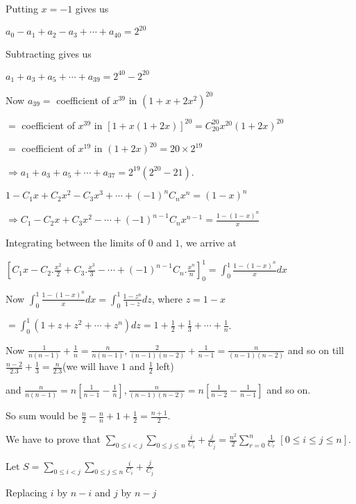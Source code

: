   Putting $x = -1$ gives us

  $a_0 - a_1 + a_2 - a_3 + \cdots + a_{40} = 2^{20}$

  Subtracting gives us

  $a_1 + a_3 + a_5 + \cdots + a_{39} = 2^{40} - 2^{20}$

  Now $a_{39} =$ coefficient of $x^{39}$ in $(1 + x + 2x^2)^{20}$

  $=$ coefficient of $x^{39}$ in $[1 + x(1 + 2x)]^{20} = C_{20}^{20}x^{20}(1 + 2x)^{20}$

  $=$ coefficient of $x^{19}$ in $(1 + 2x)^{20} = 20\times2^{19}$

  $\Rightarrow a_1 + a_3 + a_5 + \cdots + a_{37} = 2^{19}(2^{20} - 21)$.
\item $1 - C_1x + C_2x^2 - C_3x^3 + \cdots + (-1)^nC_nx^n = (1 - x)^n$

  $\Rightarrow C_1 - C_2x + C_3x^2 - \cdots + (-1)^{n - 1}C_nx^{n - 1} = \frac{1 - (1 - x)^n}{x}$

  Integrating between the limits of $0$ and $1$, we arrive at

  $\left[C_1x - C_2.\frac{x^2}{2} + C_3.\frac{x^3}{3} - \cdots + (-1)^{n - 1}C_n.\frac{x^n}{n}\right]_0^1 =
  \displaystyle\int_0^1\frac{1 - (1 - x)^n}{x}dx$

  Now $\displaystyle\int_0^1\frac{1 - (1 - x)^n}{x}dx = \int_0^1\frac{1 - z^n}{1 - z}dz$, where $z = 1 - x$

  $= \displaystyle\int_0^1(1 + z + z^2 + \cdots + z^n)dz = 1 + \frac{1}{2} + \frac{1}{3} + \cdots +
  \frac{1}{n}$.

  Now $\frac{1}{n(n - 1)} + \frac{1}{n} = \frac{n}{n(n - 1)}, \frac{2}{(n - 1)(n - 2)}+ \frac{1}{n - 1} =
  \frac{n}{(n - 1)(n - 2)}$ and so on till $\frac{n - 2}{2.3} + \frac{1}{3} = \frac{n}{2.3}$(we will have
  $1$ and $\frac{1}{2}$ left)

  and $\frac{n}{n(n - 1)} = n\left[\frac{1}{n - 1} - \frac{1}{n}\right], \frac{n}{(n - 1)(n - 2)} =
  n\left[\frac{1}{n - 2}- \frac{1}{n - 1}\right]$ and so on.

  So sum would be $\frac{n}{2} - \frac{n}{n} + 1 + \frac{1}{2} = \frac{n + 1}{2}$.
\item We have to prove that $\displaystyle\sum_{0\leq i< j}\sum_{0\leq j\leq n}\frac{i}{C_i} + \frac{j}{C_j} =
  \frac{n^2}{2}\sum_{r=0}^n\frac{1}{C_r}\;[0\leq i\leq j\leq n]$.

  Let $S = \displaystyle\sum_{0\leq i< j}\sum_{0\leq j\leq n}\frac{i}{C_i} + \frac{j}{C_j}$

  Replacing $i$ by $n - i$ and $j$ by $n - j$

